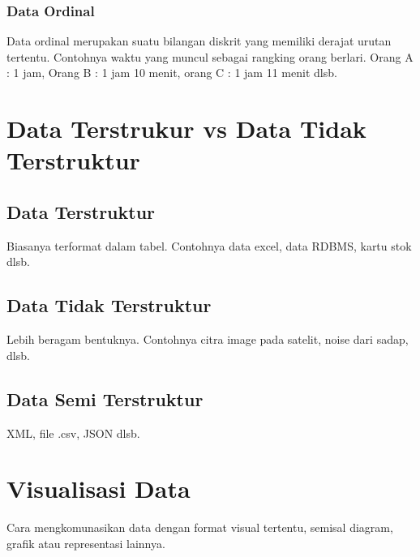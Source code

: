 \subsubsection{Data Ordinal}
Data ordinal merupakan suatu bilangan diskrit yang memiliki derajat urutan tertentu. Contohnya waktu yang muncul sebagai rangking orang berlari. Orang A : 1 jam, Orang B : 1 jam 10 menit, orang C : 1 jam 11 menit dlsb.

\section{Data Terstrukur vs Data Tidak Terstruktur}
\subsection{Data Terstruktur}
Biasanya terformat dalam tabel. Contohnya data excel, data RDBMS, kartu stok dlsb.
\subsection{Data Tidak Terstruktur}
Lebih beragam bentuknya. Contohnya citra image pada satelit, noise dari sadap, dlsb.
\subsection{Data Semi Terstruktur}
XML, file .csv, JSON dlsb.

\section{Visualisasi Data}
Cara mengkomunasikan data dengan format visual tertentu, semisal diagram, grafik atau representasi lainnya. 

